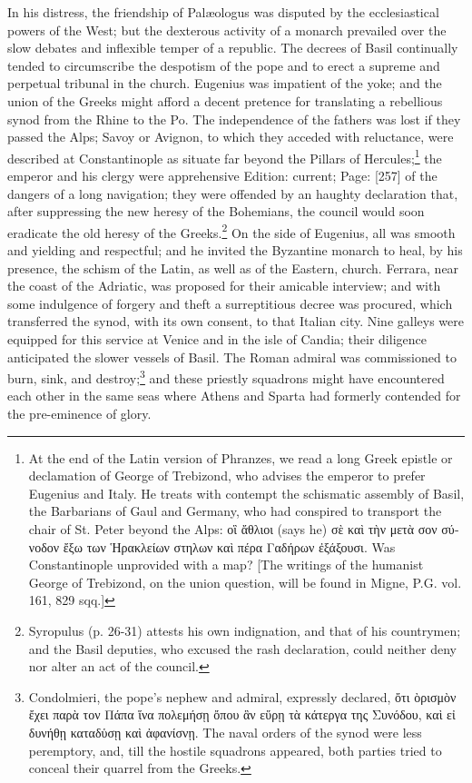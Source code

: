 In his distress, the friendship of Palæologus was disputed by the ecclesiastical powers of the West; but the dexterous activity of a monarch prevailed over the slow debates and inflexible temper of a republic. The decrees of Basil continually tended to circumscribe the despotism of the pope and to erect a supreme and perpetual tribunal in the church. Eugenius was impatient of the yoke; and the union of the Greeks might afford a decent pretence for translating a rebellious synod from the Rhine to the Po. The independence of the fathers was lost if they passed the Alps; Savoy or Avignon, to which they acceded with reluctance, were described at Constantinople as situate far beyond the Pillars of Hercules;\footnote{At the end of the Latin version of Phranzes, we read a long Greek epistle or declamation of George of Trebizond, who advises the emperor to prefer Eugenius and Italy. He treats with contempt the schismatic assembly of Basil, the Barbarians of Gaul and Germany, who had conspired to transport the chair of St. Peter beyond the Alps: \textgreek{ο\texthebrew{ἳ ἄ}θλιοι} (says he) \textgreek{σ\texthebrew{ὲ} κα\texthebrew{ὶ} τ\texthebrew{ὴ}ν μετ\texthebrew{ὰ} σον σύνοδον \texthebrew{ἔ}ξω των \texthebrew{Ἡ}ρακλείων στηλων κα\texthebrew{ὶ} πέρα Γαδήρων \texthebrew{ἐ}ξάξουσι}. Was Constantinople unprovided with a map? [The writings of the humanist George of Trebizond, on the union question, will be found in Migne, P.G. vol. 161, 829 sqq.]} the emperor and his clergy were apprehensive Edition: current; Page: [257] of the dangers of a long navigation; they were offended by an haughty declaration that, after suppressing the new heresy of the Bohemians, the council would soon eradicate the old heresy of the Greeks.\footnote{Syropulus (p. 26-31) attests his own indignation, and that of his countrymen; and the Basil deputies, who excused the rash declaration, could neither deny nor alter an act of the council.} On the side of Eugenius, all was smooth and yielding and respectful; and he invited the Byzantine monarch to heal, by his presence, the schism of the Latin, as well as of the Eastern, church. Ferrara, near the coast of the Adriatic, was proposed for their amicable interview; and with some indulgence of forgery and theft a surreptitious decree was procured, which transferred the synod, with its own consent, to that Italian city. Nine galleys were equipped for this service at Venice and in the isle of Candia; their diligence anticipated the slower vessels of Basil. The Roman admiral was commissioned to burn, sink, and destroy;\footnote{Condolmieri, the pope\texthebrew{}’s nephew and admiral, expressly declared, \textgreek{\texthebrew{ὄ}τι \texthebrew{ὸ}ρισμ\texthebrew{ὸ}ν \texthebrew{ἔ}χει παρ\texthebrew{ὰ} τον Πάπα \texthebrew{ἵ}να πολεμήσ\texthebrew{ῃ ὄ}που \texthebrew{ἃ}ν ε\texthebrew{ὕ}ρ\texthebrew{ῃ} τ\texthebrew{ὰ} κάτεργα της Συνόδου, κα\texthebrew{ὶ} ε\texthebrew{ἰ} δυνήθ\texthebrew{ῃ} καταδ\texthebrew{ὑ}σ\texthebrew{ῃ} κα\texthebrew{ὶ ἀ}φανίσν\texthebrew{ῃ}}. The naval orders of the synod were less peremptory, and, till the hostile squadrons appeared, both parties tried to conceal their quarrel from the Greeks.} and these priestly squadrons might have encountered each other in the same seas where Athens and Sparta had formerly contended for the pre-eminence of glory. 